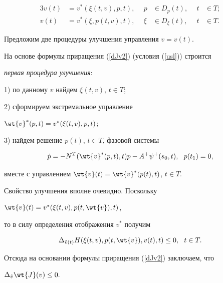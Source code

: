\begin{alignat}{3}


v(t)&=v^*(\xi(t,v),p,t),&\ \ p&\in D_p(t),&\ \ t&\in T; 


\label{usl} \\


%


v(t)&=v^*(\xi,p(t,v),t),&\ \ \xi&\in D_{\xi}(t),&\ \ t&\in T.


\label{usl1}


\end{alignat}





Предложим две процедуры улучшения управления $v=v(t)$.





На основе формулы приращения (\ref{dJv2}) (условия (\ref{usl})) строится


{\it первая процедура улучшения}\/:





1) по данному $v$ найдем $\xi(t,v)$, $t\in T$;





2) сформируем экстремальное управление


$\wt{v}^*(p,t)=v^*(\xi(t,v),p,t)$;





3) найдем решение $p(t)$, $t\in T$, фазовой системы


$$


\Dot{p}=-N^T(\wt{v}^*(p,t),t)p-A^+\psi^+(s_0,t),\ \ p(t_1)=0,


$$


вместе с управлением $\wt{v}(t)=\wt{v}^*(p(t),t)$, $t\in T$.


Свойство улучшения вполне очевидно. Поскольку


$\wt{v}(t)=v^*(\xi(t,v),p(t,\wt{v}),t)$,


то в силу определения отображения $v^*$ получим


$$


\Delta_{\Tilde{v}(t)}H(\xi(t,v),p(t,\wt{v}),v(t),t)\leq 0,\ \ t\in T.


$$


Отсюда на основании формулы приращения (\ref{dJv2}) заключаем, что


$\Delta_{\Tilde{v}}\wt{J}(v)\leq 0.$





